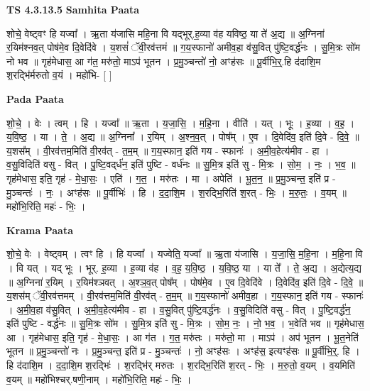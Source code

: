 \documentclass[17pt]{extarticle}
\begin{document}
\textbf{TS 4.3.13.5 } \newline
\textbf{Samhita Paata} \newline

शोचे॒ वेष्ट्वꣳ हि यज्वा᳚ । ऋ॒ता य॑जासि महि॒ना वि यद्भूर्.ह॒व्या व॑ह यविष्ठ॒ या ते॑ अ॒द्य ॥ अ॒ग्निना॑ र॒यिम॑श्नव॒त् पोष॑मे॒व दि॒वेदि॑वे । य॒शसं॑ ॅवी॒रव॑त्तमं ॥ ग॒य॒स्फानो॑ अमीव॒हा व॑सु॒वित् पु॑ष्टि॒वर्द्ध॑नः । सु॒मि॒त्रः सो॑म नो भव ॥ गृह॑मेधास॒ आ ग॑त॒ मरु॑तो॒ माऽप॑ भूतन । प्र॒मु॒ञ्चन्तो॑ नो॒ अꣳह॑सः ॥ पू॒र्वीभि॒र्॒.हि द॑दाशि॒म श॒रद्भि॑र्मरुतो व॒यं । महो॑भि- [  ] \newline

\textbf{Pada Paata} \newline

शो॒चे॒ । वेः । त्वम् । हि । यज्वा᳚ ॥ ऋ॒ता । य॒जा॒सि॒ । म॒हि॒ना । वीति॑ । यत् । भूः । ह॒व्या । व॒ह॒ । य॒वि॒ष्ठ॒ । या । ते॒ । अ॒द्य ॥ अ॒ग्निना᳚ । र॒यिम् । अ॒श्न॒व॒त् । पोष᳚म् । ए॒व । दि॒वेदि॑व॒ इति॑ दि॒वे - दि॒वे॒ ॥ य॒शस᳚म् । वी॒रव॑त्तम॒मिति॑ वी॒रव॑त् - त॒म॒म् ॥ ग॒य॒स्फान॒ इति॑ गय - स्फानः॑ । अ॒मी॒व॒हेत्य॑मीव - हा । व॒सु॒विदिति॑ वसु - वित् । पु॒ष्टि॒वद्‌र्ध॑न॒ इति॑ पुष्टि - वर्ध॑नः ॥ सु॒मि॒त्र इति॑ सु - मि॒त्रः । सो॒म॒ । नः॒ । भ॒व॒ ॥ गृह॑मेधास॒ इति॒ गृह॑ - मे॒धा॒सः॒ । एति॑ । ग॒त॒ । मरु॑तः । मा । अपेति॑ । भू॒त॒न॒ ॥ प्र॒मु॒ञ्चन्त॒ इति॑ प्र - मु॒ञ्चन्तः॑ । नः॒ । अꣳह॑सः ॥ पू॒र्वीभिः॑ । हि । द॒दा॒शि॒म । श॒रद्भि॒रिति॑ श॒रत् - भिः॒ । म॒रु॒तः॒ । व॒यम् ॥ महो॑भि॒रिति॒ महः॑ - भिः॒ ।  \newline


\textbf{Krama Paata} \newline

शो॒चे॒ वेः । वेष्ट्वम् । त्वꣳ हि । हि यज्वा᳚ । यज्वेति॒ यज्वा᳚ ॥ ऋ॒ता य॑जासि । य॒जा॒सि॒ म॒हि॒ना । म॒हि॒ना वि । वि यत् । यद् भूः । भूर्. ह॒व्या । ह॒व्या व॑ह । व॒ह॒ य॒वि॒ष्ठ॒ । य॒वि॒ष्ठ॒ या । या ते᳚ । ते॒ अ॒द्य । अ॒द्येत्य॒द्य ॥ अ॒ग्निना॑ र॒यिम् । र॒यिम॑श्ञवत् । अ॒श्ञ॒व॒त् पोष᳚म् । पोष॑मे॒व । ए॒व दि॒वेदि॑वे । दि॒वेदि॑व॒ इति॑ दि॒वे - दि॒वे॒ ॥ य॒शस॑म् ॅवी॒रव॑त्तमम् । वी॒रव॑त्तम॒मिति॑ वी॒रव॑त् - त॒म॒म् ॥ ग॒य॒स्फानो॑ अमीव॒हा । ग॒य॒स्फान॒ इति॑ गय - स्फानः॑ । अ॒मी॒व॒हा व॑सु॒वित् । अ॒मी॒व॒हेत्य॑मीव - हा । व॒सु॒वित् पु॑ष्टि॒वर्द्ध॑नः । व॒सु॒विदिति॑ वसु - वित् । पु॒ष्टि॒वर्द्ध॑न॒ इति॑ पुष्टि - वर्द्ध॑नः ॥ सु॒मि॒त्रः सो॑म । सु॒मि॒त्र इति॑ सु - मि॒त्रः । सो॒म॒ नः॒ । नो॒ भ॒व॒ । भ॒वेति॑ भव ॥ गृह॑मेधास॒ आ । गृह॑मेधास॒ इति॒ गृह॑ - मे॒धा॒सः॒ । आ ग॑त । ग॒त॒ मरु॑तः । मरु॑तो॒ मा । माऽप॑ । अप॑ भूतन । भू॒त॒नेति॑ भूतन ॥ प्र॒मु॒ञ्चन्तो॑ नः । प्र॒मु॒ञ्चन्त॒ इति॑ प्र - मु॒ञ्चन्तः॑ । नो॒ अꣳह॑सः । अꣳह॑स॒ इत्यꣳह॑सः ॥ पू॒र्वीभि॒र्॒. हि । हि द॑दाशि॒म । द॒दा॒शि॒म श॒रद्भिः॑ । श॒रद्भि॑र् मरुतः । श॒रद्भि॒रिति॑ श॒रत् - भिः॒ । म॒रु॒तो॒ व॒यम् । व॒यमिति॑ व॒यम् ॥ महो॑भिश्चर्.षणी॒नाम् । महो॑भि॒रिति॒ महः॑ - भिः॒ । \newline
\end{document}
